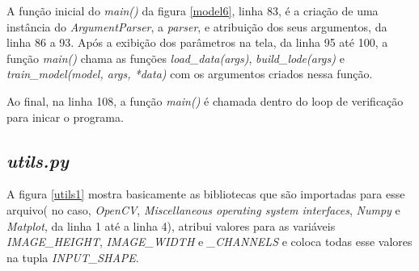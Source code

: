 A função inicial do \textit{main()} da figura \ref{model6}, linha 83,  é a criação de uma instância do \textit{ArgumentParser}, a \textit{parser}, e atribuição dos seus argumentos, da linha 86 a 93.
Após a exibição dos parâmetros na tela, da linha 95 até 100, a função \textit{main()} chama as funções \textit{load\_data(args)}, \textit{build\_lode(args)} e \textit{train\_model(model, args, *data)} com os argumentos criados nessa função.

Ao final, na linha 108, a função \textit{main()} é chamada dentro do loop de verificação para inicar o programa.

\subsection{\textit{utils.py}}
\label{sec:utils.py}

	\begin{figure}[H]
		\centering
\end{figure}
A figura \ref{utils1} mostra basicamente as bibliotecas que são importadas para esse arquivo( no caso, \textit{OpenCV}, \textit{Miscellaneous operating system interfaces}, \textit{Numpy} e \textit{Matplot}, da linha 1 até a linha 4), atribui valores para as variáveis \textit{IMAGE\_HEIGHT}, \textit{IMAGE\_WIDTH} e \textit{\IMAGE\_CHANNELS} e coloca todas esse valores na tupla \textit{INPUT\_SHAPE}.


\begin{figure}[H]
	\centering
\end{figure}

